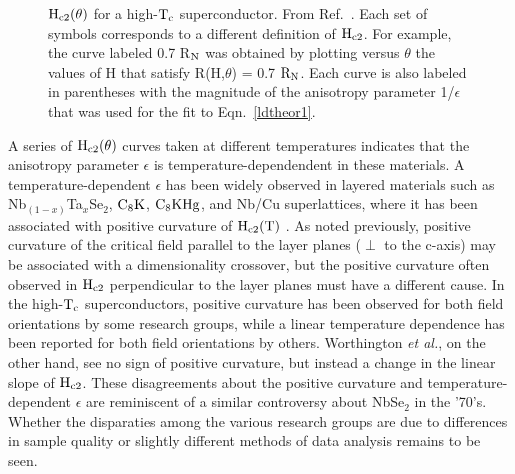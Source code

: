 \begin{figure}
\vspace{12cm}
\caption[$\rm H_{c2}(\theta)$ for a high-$\rm T_c$ superconductor]{$\rm
H_{c2}(\theta)$   for     a    high-$\rm   T_c$    superconductor.     From
Ref.~\cite{iye87a}.   Each  set of  symbols  corresponds  to   a  different
definition of $\rm H_{c2}$. For example, the curve labeled 0.7 R$\rm _N$ was
obtained  by  plotting versus  $\theta$   the  values  of  H  that  satisfy
R(H,$\theta$)  = 0.7 $\rm R_N$.   Each curve is  also labeled in parentheses
with the magnitude of the anisotropy  parameter  1/$\epsilon$ that was used
for the fit to Eqn.~\ref{ldtheor1}.}
\label{hitctheta}
\end{figure}

        A  series of  $\rm  H_{c2}(\theta)$   curves  taken   at  different
temperatures indicates    that   the   anisotropy parameter   $\epsilon$ is
temperature-dependendent    in    these     materials.\cite{iye87a}       A
temperature-dependent $\epsilon$   has   been widely  observed  in  layered
materials    such as Nb$_{(1    -  x)}$Ta$_x$Se$_2$,\cite{dalrymple84} $\rm
C_8K$\cite{koike80},        $\rm      C_8KHg$,\cite{B340}       and   Nb/Cu
superlattices\cite{chun84},  where it  has been  associated  with  positive
curvature of $\rm H_{c2}(T)$ .  As  noted previously, positive curvature of
the critical field parallel to the layer planes ($\perp$ to the c-axis) may
be associated with a  dimensionality  crossover, but the positive curvature
often observed in $\rm H_{c2}$ perpendicular to  the layer planes must have
a different    cause.   In the   high-$\rm  T_c$  superconductors, positive
curvature  has been  observed for both  field orientations by some research
groups,\cite{iye87,iye87a,moodera88,sakakibara87}    while   a       linear
temperature  dependence  has been reported for   both field orientations by
others.\cite{orlando87,orlando87a,uchida87b,vanbentum87}  Worthington  {\em
et  al.\/}, on  the   other hand, see no sign   of  positive curvature, but
instead  a change in the linear  slope of $\rm H_{c2}$.\cite{worthington87}
These disagreements about the  positive curvature and temperature-dependent
$\epsilon$ are reminiscent of  a similar controversy  about NbSe$_2$ in the
'70's.\cite{foner73,muto73}  Whether  the   disparaties among  the  various
research groups are  due to  differences in   sample quality  or  slightly
different methods of data analysis remains to be seen.

